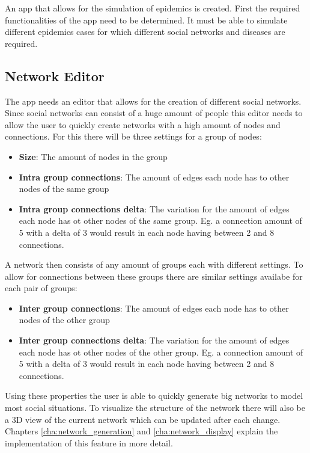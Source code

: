 An app that allows for the simulation of epidemics is created. First the required functionalities
of the app need to be determined. It must be able to simulate different epidemics cases for
which different social networks and diseases are required.

\subsection{Network Editor}
The app needs an editor that allows for the creation of different social networks. Since
social networks can consist of a huge amount of people this editor needs to allow the user
to quickly create networks with a high amount of nodes and connections. For this there
will be three settings for a group of nodes:

\begin{itemize}
    \item \textbf{Size}: The amount of nodes in the group
    \item \textbf{Intra group connections}: The amount of edges each node has to other nodes
    of the same group
    \item \textbf{Intra group connections delta}: The variation for the amount of edges each
    node has ot other nodes of the same group. Eg. a connection amount of 5 with a delta of 3
    would result in each node having between 2 and 8 connections.
\end{itemize}

A network then consists of any amount of groups each with different settings. To allow
for connections between these groups there are similar settings availabe for each pair of
groups:

\begin{itemize}
    \item \textbf{Inter group connections}: The amount of edges each node has to other nodes
    of the other group
    \item \textbf{Inter group connections delta}: The variation for the amount of edges each
    node has ot other nodes of the other group. Eg. a connection amount of 5 with a delta of 3
    would result in each node having between 2 and 8 connections.
\end{itemize}

Using these properties the user is able to quickly generate big networks to model most
social situations. To visualize the structure of the network there will also be a 3D view
of the current network which can be updated after each change. Chapters \ref{cha:network_generation}
and \ref{cha:network_display} explain the implementation of this feature in more detail.

